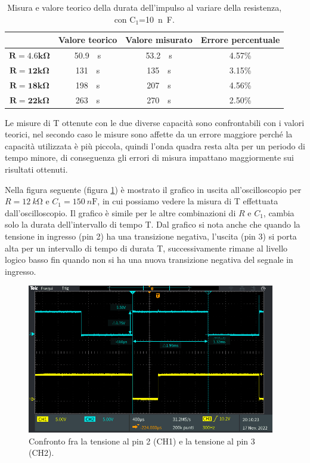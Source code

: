 \documentclass{report}
\begin{document}
\begin{table}[h!]
	\centering
	\begin{tabular}{|c|c|c|c|}
		\cline{2-4} 
		\multicolumn{1}{c|}{} & \textbf{Valore teorico} & \textbf{Valore misurato}& \textbf{Errore percentuale}\\ 
		\hline
		$\mathbf{{R = 4.6k}\Omega}$ & \SI{50.9}{\mu\second} & \SI{53.2}{\mu\second} & 4.57\% \\ 
		\hline
		$\mathbf{{R = 12k}\Omega}$ & \SI{131}{\mu\second} & \SI{135}{\mu\second} & 3.15\% \\ 
		\hline
		$\mathbf{{R = 18k}\Omega}$ & \SI{198}{\mu\second} & \SI{207}{\mu\second} & 4.56\% \\ 
		\hline
		$\mathbf{{R = 22k}\Omega}$ & \SI{263}{\mu\second} & \SI{270}{\mu\second} & 2.50\% \\ 
		\hline
	\end{tabular}
	\caption{Misura e valore teorico della durata dell'impulso al variare della resistenza, con $\mathrm{C_1}$=\SI{10}{n\farad}.}
	\label{table:impulsoCvar}
\end{table}
\newpage
\noindent Le misure di T ottenute con le due diverse capacità sono confrontabili con i valori teorici, nel secondo caso le misure sono affette da un errore maggiore perché la capacità utilizzata è più piccola, quindi l'onda quadra resta alta per un periodo di tempo minore, di  conseguenza gli errori di misura impattano maggiormente sui risultati ottenuti. \par
Nella figura seguente (figura \ref{figura:TEK00014}) è mostrato il grafico in uscita all'oscilloscopio per $R = \SI{12}{k\ohm}$ e $C_1 = \SI{150}{n\farad}$, in cui possiamo vedere la misura di T effettuata dall'oscilloscopio. Il grafico è simile per le altre combinazioni di $R$ e $C_1$, cambia solo la durata dell'intervallo di tempo T. Dal grafico si nota anche che quando la tensione in ingresso (pin 2) ha una transizione negativa, l'uscita (pin 3) si porta alta per un intervallo di tempo di durata T, successivamente rimane al livello logico basso fin quando non si ha una nuova transizione negativa del segnale in ingresso.
\begin{figure}[h!]
	\centering
	\includegraphics[height=6.5cm]{immagini/TEK00014}
	\caption{Confronto fra la tensione al pin 2 (CH1) e la tensione al pin 3 (CH2).}
	\label{figura:TEK00014}
\end{figure}
\end{document}
